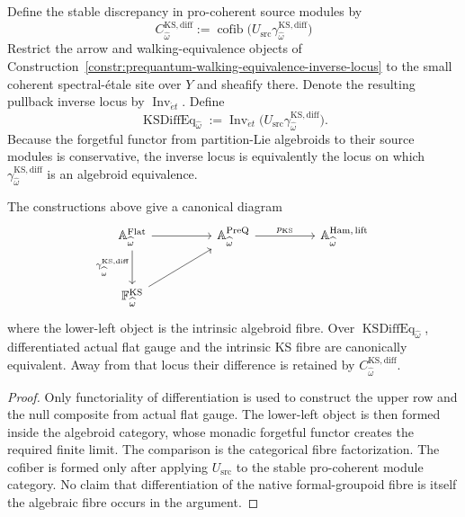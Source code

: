 \begin{definition}
\label{def:prequantum-differentiated-ks-discrepancy}
Define the stable discrepancy in pro-coherent source modules by
\[
\boxed{
C_{\widehat\omega}^{\mathrm{KS,diff}}
:=
\operatorname{cofib}
\bigl(U_{\mathrm{src}}\gamma_{\widehat\omega}^{\mathrm{KS,diff}}\bigr)
}
\]
Restrict the arrow and walking-equivalence objects of
Construction~\ref{constr:prequantum-walking-equivalence-inverse-locus} to the
small coherent spectral-\'etale site over $Y$ and sheafify there.  Denote the
resulting pullback inverse locus by $\operatorname{Inv}_{\acute et}$.  Define
\[
\boxed{
\operatorname{KSDiffEq}_{\widehat\omega}
:=
\operatorname{Inv}_{\acute et}
\bigl(U_{\mathrm{src}}\gamma_{\widehat\omega}^{\mathrm{KS,diff}}\bigr).
}
\]
Because the forgetful functor from partition-Lie algebroids to their source
modules is conservative, the inverse locus is equivalently the locus on which
$\gamma_{\widehat\omega}^{\mathrm{KS,diff}}$ is an algebroid equivalence.
\end{definition}

\begin{theorem}
\label{thm:prequantum-differentiation-integrated-extension}
The constructions above give a canonical diagram
\[
\begin{tikzcd}[column sep=huge,row sep=large]
\mathbb A_{\widehat\omega}^{\mathrm{Flat}}
  \arrow[r] \arrow[d,"\gamma_{\widehat\omega}^{\mathrm{KS,diff}}"'] &
\mathbb A_{\widehat\omega}^{\mathrm{PreQ}}
  \arrow[r,"p_{\mathrm{KS}}"] &
\mathbb A_{\widehat\omega}^{\mathrm{Ham,\,lift}} \\
\mathbb F_{\widehat\omega}^{\mathrm{KS}}
  \arrow[ur] & &
\end{tikzcd}
\]
where the lower-left object is the intrinsic algebroid fibre.  Over
$\operatorname{KSDiffEq}_{\widehat\omega}$, differentiated actual flat gauge and
the intrinsic KS fibre are canonically equivalent.  Away from that locus their
difference is retained by $C_{\widehat\omega}^{\mathrm{KS,diff}}$.
\end{theorem}

\begin{proof}
Only functoriality of differentiation is used to construct the upper row and the
null composite from actual flat gauge.  The lower-left object is then formed
inside the algebroid category, whose monadic forgetful functor creates the
required finite limit.  The comparison is the categorical fibre factorization.
The cofiber is formed only after applying $U_{\mathrm{src}}$ to the stable
pro-coherent module category.  No claim that differentiation of the native
formal-groupoid fibre is itself the algebraic fibre occurs in the argument.
\end{proof}

